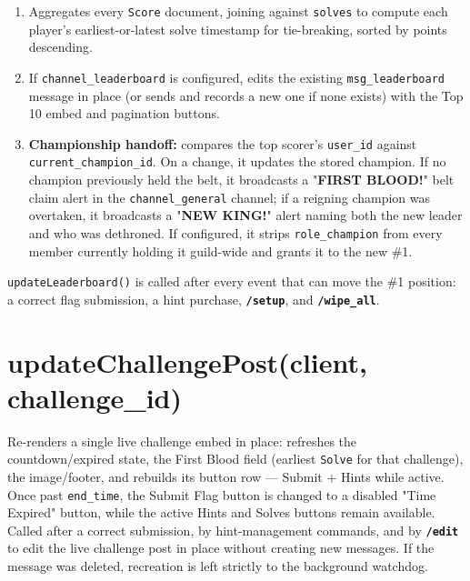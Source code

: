 \documentclass[12pt,a4paper]{report}
\newcommand{\cmd}[1]{\texttt{\color{cybercyan}\textbf{#1}}}
\begin{document}
\begin{enumerate}
    \item Aggregates every \texttt{Score} document, joining against \texttt{solves} to compute
          each player's earliest-or-latest solve timestamp for tie-breaking, sorted by points
          descending.
    \item If \texttt{channel\_leaderboard} is configured, edits the existing
          \texttt{msg\_leaderboard} message in place (or sends and records a new one if none
          exists) with the Top 10 embed and pagination buttons.
    \item \textbf{Championship handoff:} compares the top scorer's \texttt{user\_id} against
          \texttt{current\_champion\_id}. On a change, it updates the stored champion. If no champion
          previously held the belt, it broadcasts a "\textbf{FIRST BLOOD!}" belt claim alert in the
          \texttt{channel\_general} channel; if a reigning champion was overtaken, it broadcasts a
          "\textbf{NEW KING!}" alert naming both the new leader and who was dethroned. If configured,
          it strips \texttt{role\_champion} from every member currently holding it guild-wide and
          grants it to the new \#1.
\end{enumerate}

\texttt{updateLeaderboard()} is called after every event that can move the \#1 position: a correct
flag submission, a hint purchase, \cmd{/setup}, and \cmd{/wipe\_all}.

\section{updateChallengePost(client, challenge\_id)}

Re-renders a single live challenge embed in place: refreshes the countdown/expired state, the
First Blood field (earliest \texttt{Solve} for that challenge), the image/footer, and rebuilds its
button row --- Submit + Hints while active. Once past \texttt{end\_time}, the Submit Flag button is changed
to a disabled "Time Expired" button, while the active Hints and Solves buttons remain available. Called after a correct submission, by hint-management commands, and by \cmd{/edit} to edit the live challenge post in place without creating new messages. If the message was deleted, recreation is left strictly to the background watchdog.
\end{document}
